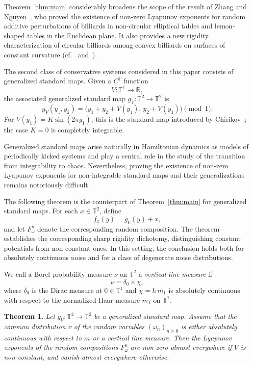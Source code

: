 \documentclass[a4paper,12pt,reqno]{amsart}
\numberwithin{equation}{section}
\newtheorem{theorem}{Theorem}[section]
\newcommand{\Rr}{{\mathbb{R}}}
\newcommand{\Tt}{{\mathbb{T}}}
\begin{document}
Theorem~\ref{thm:main} considerably broadens the scope of the result of Zhang and Nguyen~\cite{NguyenZhang2026}, who proved the existence of non-zero Lyapunov exponents for random additive perturbations of billiards in non-circular elliptical tables and lemon-shaped tables in the Euclidean plane. It also provides a new rigidity characterization of circular billiards among convex billiards on surfaces of constant curvature (cf.~\cite{Bialy:1993ty} and~\cite{CzudekDeSimoiGadPoon26}). 

The second class of conservative systems considered in this paper consists of generalized standard maps. Given a $C^1$ function
\[
V\colon\Tt^1\to\Rr,
\]
the associated generalized standard map $g_V\colon\Tt^2\to\Tt^2$ is
\[
g_V(y_1,y_2)
=
\bigl(y_1+y_2+V(y_1),\,y_2+V(y_1)\bigr)
\pmod 1.
\]
For $V(y_1)=K\sin(2\pi y_1)$, this is the standard map introduced by Chirikov~\cite{CHIRIKOV1979263}; the case $K=0$ is completely integrable.

Generalized standard maps arise naturally in Hamiltonian dynamics as models of periodically kicked systems and play a central role in the study of the transition from integrability to chaos. Nevertheless, proving the existence of non-zero Lyapunov exponents for non-integrable standard maps and their generalizations remains notoriously difficult.

The following theorem is the counterpart of Theorem~\ref{thm:main} for generalized standard maps. For each $x\in\Tt^2$, define
\[
f_x(y)=g_V(y)+x,
\]
and let $F_\omega^n$ denote the corresponding random composition. The theorem establishes the corresponding sharp rigidity dichotomy, distinguishing constant potentials from non-constant ones. In this setting, the conclusion holds both for absolutely continuous noise and for a class of degenerate noise distributions.

We call a Borel probability measure $\nu$ on $\Tt^2$ a \emph{vertical line measure} if
\[
\nu=\delta_0\times\chi,
\]
where $\delta_0$ is the Dirac measure at $0\in\Tt^1$ and
$\chi=h\,m_1$ is absolutely continuous with respect to the normalized Haar measure $m_1$ on $\Tt^1$.

\begin{theorem}
\label{thm:standard}
Let $g_V\colon\Tt^2\to\Tt^2$ be a generalized standard map. Assume that the common distribution $\nu$ of the random variables $(\omega_n)_{n\geq0}$ is either absolutely continuous with respect to $m$ or a vertical line measure. Then the Lyapunov exponents of the random compositions $F_\omega^n$ are non-zero almost everywhere if $V$ is non-constant, and vanish almost everywhere otherwise.
\end{theorem}
\end{document}
